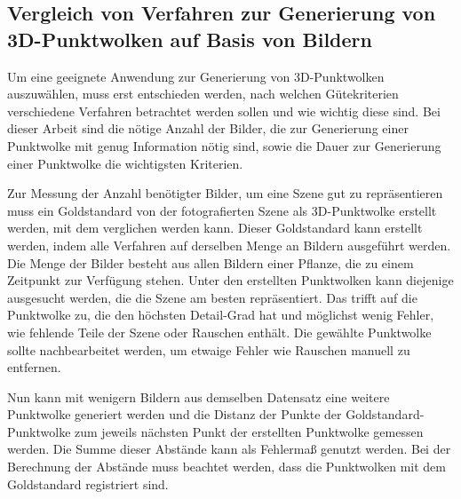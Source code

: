 \documentclass[12pt,titlepage, twoside]{article}
\begin{document}
\subsection{Vergleich von Verfahren zur Generierung von 3D-Punktwolken auf Basis von Bildern}
\label{sec:ergebnisse:sub:point:cloud:generation}

Um eine geeignete Anwendung zur Generierung von 3D-Punktwolken auszuwählen, muss erst entschieden werden, nach welchen Gütekriterien verschiedene Verfahren betrachtet werden sollen und wie wichtig diese sind.
Bei dieser Arbeit sind die nötige Anzahl der Bilder, die zur Generierung einer Punktwolke mit genug Information nötig sind, sowie die Dauer zur Generierung einer Punktwolke die wichtigsten Kriterien.

Zur Messung der Anzahl benötigter Bilder, um eine Szene gut zu repräsentieren muss ein Goldstandard von der fotografierten Szene als 3D-Punktwolke erstellt werden, mit dem verglichen werden kann.
Dieser Goldstandard kann erstellt werden, indem alle Verfahren auf derselben Menge an Bildern ausgeführt werden. 
Die Menge der Bilder besteht aus allen Bildern einer Pflanze, die zu einem Zeitpunkt zur Verfügung stehen.
Unter den erstellten Punktwolken kann diejenige ausgesucht werden, die die Szene am besten repräsentiert. 
Das trifft auf die Punktwolke zu, die den höchsten Detail-Grad hat und möglichst wenig Fehler, wie fehlende Teile der Szene oder Rauschen enthält.
Die gewählte Punktwolke sollte nachbearbeitet werden, um etwaige Fehler wie Rauschen manuell zu entfernen.

Nun kann mit wenigern Bildern aus demselben Datensatz eine weitere Punktwolke generiert werden und die Distanz der Punkte der Goldstandard-Punktwolke zum jeweils nächsten Punkt der erstellten Punktwolke gemessen werden.
Die Summe dieser Abstände kann als Fehlermaß genutzt werden. Bei der Berechnung der Abstände muss beachtet werden, dass die Punktwolken mit dem Goldstandard registriert sind.
\end{document}
